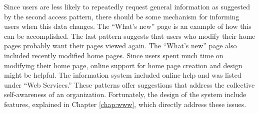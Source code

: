 Since users are less likely to repeatedly request general information as
suggested by the second access pattern, there should be some mechanism for
informing users when this data changes.  The ``What's new'' page is an example
of how this can be accomplished.  The last pattern suggests that users who
modify their home pages probably want their pages viewed again.  The ``What's
new'' page also included recently modified home pages.  Since users spent much
time on modifying their home page, online support for home page creation and
design might be helpful.  The information system included online help and was
listed under ``Web Services.''  These patterns offer suggestions that address
the collective self-awareness of an organization.  Fortunately, the design of
the system include features, explained in Chapter \ref{chap:www}, which
directly address these issues.
